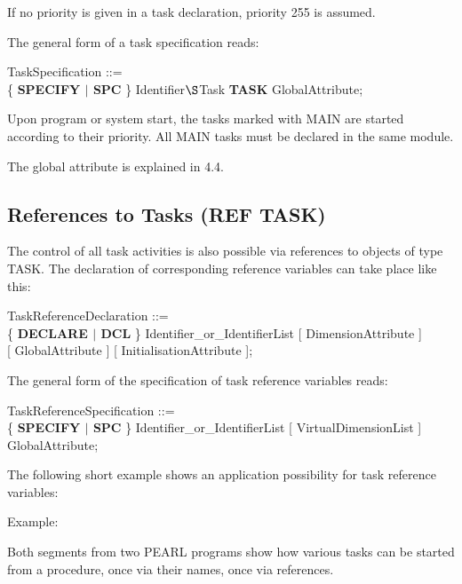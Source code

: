 If no priority is given in a task declaration, priority 255 is assumed.


The general form of a task specification reads:

TaskSpecification ::=\\
\x \{ {\bf SPECIFY $\mid$ SPC} \} Identifier$\S $Task {\bf TASK} GlobalAttribute;

Upon program or system start, the tasks marked with MAIN are started
according to their priority. All MAIN tasks must be declared in the same
module.

The global attribute is explained in 4.4.

\subsection{References to Tasks (REF TASK)}   %

The control of all task activities is also possible via references to
objects of type TASK. The declaration of corresponding reference
variables can take place like this:

TaskReferenceDeclaration ::= \\
\x \{ {\bf DECLARE $\mid$ DCL} \} Identifier\_or\_IdentifierList [ DimensionAttribute ]\\
 [ GlobalAttribute ] [ InitialisationAttribute ];

The general form of the specification of task reference variables reads:

TaskReferenceSpecification ::= \\
\x \{ {\bf SPECIFY $\mid$ SPC} \} Identifier\_or\_IdentifierList [ VirtualDimensionList ] \\
 GlobalAttribute;

The following short example shows an application possibility for task
reference variables:

Example:

Both segments from two PEARL programs show how various tasks can be
started from a procedure, once via their names, once via references.

